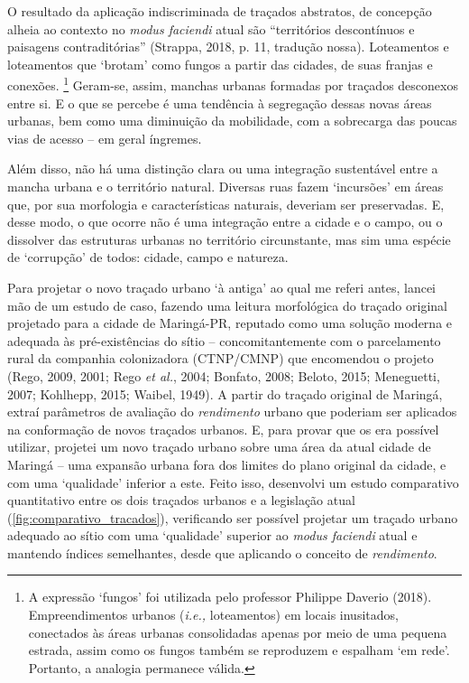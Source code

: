\documentclass[12pt, a4paper]{book} %
\begin{document}
        O resultado da aplicação indiscriminada de traçados abstratos, de concepção alheia ao contexto no \textit{modus faciendi} atual são ``territórios descontínuos e paisagens contraditórias'' (Strappa, 2018, p. 11, tradução nossa). Loteamentos e loteamentos que `brotam' como fungos a partir das cidades, de suas franjas e conexões.
            \footnote[1]{A expressão `fungos' foi utilizada pelo professor Philippe Daverio (2018). Empreendimentos urbanos (\textit{i.e.,} loteamentos) em locais inusitados, conectados às áreas urbanas consolidadas apenas por meio de uma pequena estrada, assim como os fungos também se reproduzem e espalham `em rede'. Portanto, a analogia permanece válida.} 
        Geram-se, assim, manchas urbanas formadas por traçados desconexos entre si. E o que se percebe é uma tendência à segregação dessas novas áreas urbanas, bem como uma diminuição da mobilidade, com a sobrecarga das poucas vias de acesso – em geral íngremes.

        Além disso, não há uma distinção clara ou uma integração sustentável entre a mancha urbana e o território natural. Diversas ruas fazem `incursões' em áreas que, por sua morfologia e características naturais, deveriam ser preservadas. E, desse modo, o que ocorre não é uma integração entre a cidade e o campo, ou o dissolver das estruturas urbanas no território circunstante, mas sim uma espécie de `corrupção' de todos: cidade, campo e natureza.



        Para projetar o novo traçado urbano `à antiga' ao qual me referi antes, lancei mão de um estudo de caso, fazendo uma leitura morfológica do traçado original projetado para a cidade de Maringá-PR, reputado como uma solução moderna e adequada às pré-existências do sítio – concomitantemente com o parcelamento rural da companhia colonizadora (CTNP/CMNP) que encomendou o projeto (Rego, 2009, 2001; Rego \textit{et al.}, 2004; Bonfato, 2008; Beloto, 2015; Meneguetti, 2007; Kohlhepp, 2015; Waibel, 1949). A partir do traçado original de Maringá, extraí parâmetros de avaliação do \textit{rendimento} urbano que poderiam ser aplicados na conformação de novos traçados urbanos. E, para provar que os era possível utilizar, projetei um novo traçado urbano sobre uma área da atual cidade de Maringá – uma expansão urbana fora dos limites do plano original da cidade, e com uma `qualidade' inferior a este. Feito isso, desenvolvi um estudo comparativo quantitativo entre os dois traçados urbanos e a legislação atual (\autoref{fig:comparativo_tracados}), verificando ser possível projetar um traçado urbano adequado ao sítio com uma `qualidade' superior ao \textit{modus faciendi} atual e mantendo índices semelhantes, desde que aplicando o conceito de \textit{rendimento}.
\end{document}
